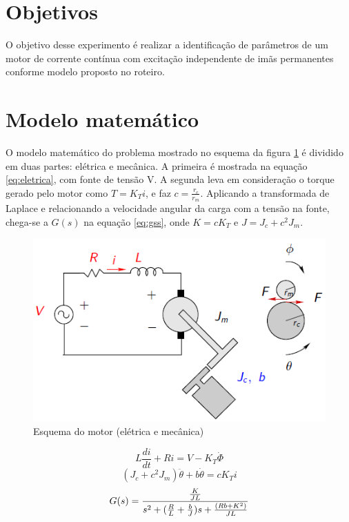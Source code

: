 \documentclass{article}
\begin{document}


\onehalfspacing
\section{Objetivos} 
O objetivo desse experimento é realizar a identificação de parâmetros de um motor de corrente contínua com excitação independente de imãs permanentes conforme modelo proposto no roteiro\cite{bb:roteiro}. 
	
\section{Modelo matemático}
O modelo matemático do problema mostrado no esquema da figura \ref{fig:esqmotor} é dividido em duas partes: elétrica e mecânica. A primeira é mostrada na equação \ref{eq:eletrica}, com fonte de tensão V. A segunda leva em consideração o torque gerado pelo motor como $T=K_Ti$, e faz $c=\frac{r_c}{r_m}$. Aplicando a transformada de Laplace e relacionando a velocidade angular da carga com a tensão na fonte, chega-se a $G(s)$ na equação \ref{eq:gss}, onde $K=cK_T$ e $J=J_c+c^2J_m$.

\begin{figure}[H]
	\centering
	\includegraphics[width=0.8\linewidth]{esqmotor}
	\caption{Esquema do motor (elétrica e mecânica)}
	\label{fig:esqmotor}
\end{figure}

\begin{equation}
\label{eq:eletrica}
L\frac{di}{dt}+Ri=V-K_T\dot{\Phi}
\end{equation}
\begin{equation}
\label{eq:mecanica}
(J_c+c^2J_m)\ddot{\theta}+b\dot{\theta}=cK_Ti
\end{equation}
\begin{equation}
\label{eq:gss}
G(s)=\frac{\frac{K}{JL}}{s^2+(\frac{R}{L}+\frac{b}{J})s+\frac{(Rb+K^2)}{JL}}\\
\end{equation}
\end{document}
